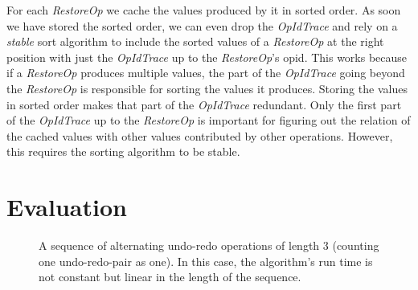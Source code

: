\documentclass[sigplan,natbib=false,review]{acmart}
\newcommand{\setop}[4][set]{$\mathit{#1_{#2}^{#3}}{(#4)}$}
\newcommand{\undop}[5][undo]{$\mathit{#1_{#2}^{#3}}{(_{#4}^{#5})}$}
\newcommand{\redop}[5][redo]{$\mathit{#1_{#2}^{#3}}{(_{#4}^{#5})}$}
\newcommand{\restopkind}{\textit{RestoreOp}}
\newcommand{\opidtrace}{\textit{OpIdTrace}}
\begin{document}
For each \restopkind{} we cache the values produced by it in sorted order.
As soon we have stored the sorted order, we can even drop the \opidtrace{} and rely
on a \emph{stable} sort algorithm to include the sorted values of a \restopkind{}
at the right position with just the \opidtrace{} up to the \restopkind{}'s \gls*{opid}.
This works because if a \restopkind{} produces multiple values, the part of the \opidtrace{}
going beyond the \restopkind{} is responsible for sorting the values it produces.
Storing the values in sorted order makes that part of the \opidtrace{} redundant.
Only the first part of the \opidtrace{} up to the \restopkind{} is important for figuring
out the relation of the cached values with other values contributed by other operations.
However, this requires the sorting algorithm to be stable.


\section{Evaluation}\label{sec:evaluation}


\begin{figure*}[ht!]
\centering
{}
\caption{
  A sequence of alternating undo-redo operations
  of length $3$ (counting one undo-redo-pair as one).
  In this case, the algorithm's run time is not constant but linear
  in the length of the sequence.
}\label{fig:degenerate-op-sequence}
\end{figure*}
\end{document}
